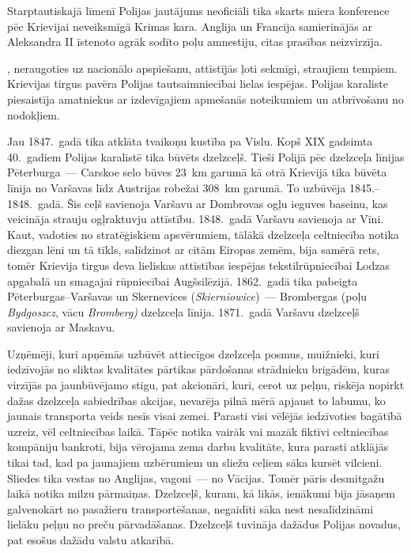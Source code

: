 \documentclass[twoside,a5paper,12pt,fleqn,openany]{extbook}
\newcommand{\pltxti}[1]{\textit{\textpolish{#1}}}
\newcommand{\detxti}[1]{\textit{\textgerman{#1}}}
\begin{document}
Starptautiskajā līmenī Polijas jautājums neoficiāli tika skarts miera konference pēc Krievijai neveiksmīgā Krimas kara. Anglija un Francija samierinājās ar Aleksandra II īstenoto agrāk sodīto poļu amnestiju, citas prasības neizvirzīja.

, neraugoties uz nacionālo apspiešanu, attīstījās ļoti sekmīgi, straujiem tempiem. Krievijas tirgus pavēra Polijas tautsaimniecībai lielas iespējas. Polijas karaliste piesaistīja amatniekus ar izdevīgajiem apmešanās noteikumiem un atbrīvošanu no nodokļiem.

Jau 1847.~gadā tika atklāta tvaikoņu kustība pa Vislu. Kopš XIX gadsimta 40.~gadiem Polijas karalistē tika būvēts dzelzceļš. Tieši Polijā pēc dzelzceļa līnijas Pēterburga~--- Carskoe selo būves 23~km garumā kā otrā Krievijā tika būvēta līnija no Varšavas līdz Austrijas robežai 308~km garumā. To uzbūvēja 1845.--1848.~gadā. Šis ceļš savienoja Varšavu ar Dombrovas ogļu ieguves baseinu, kas veicināja strauju ogļraktuvju attīstību. 1848.~gadā Varšavu savienoja ar Vīni. Kaut, vadoties no stratēģiskiem apsvērumiem, tālākā dzelzceļa celtniecība notika diezgan lēni un tā tīkls, salīdzinot ar citām Eiropas zemēm, bija samērā rets, tomēr Krievija tirgus deva lieliskas attīstības iespējas tekstilrūpniecībai Lodzas apgabalā un smagajai rūpniecībai Augšsilēzijā. 1862.~gadā tika pabeigta Pēterburgas--Varšavas un Skernevices (\pltxti{Skierniowice})~--- Brombergas (poļu \pltxti{Bydgoszcz}, vācu \detxti{Bromberg)} dzelzceļa līnija. 1871.~gadā Varšavu dzelzceļš savienoja ar Maskavu.

Uzņēmēji, kuri apņēmās uzbūvēt attiecīgos dzelzceļa posmus, muižnieki, kuri iedzīvojās no sliktas kvalitātes pārtikas pārdošanas strādnieku brigādēm, kuras virzījās pa jaunbūvējamo stigu, pat akcionāri, kuri, cerot uz peļņu, riskēja nopirkt dažas dzelzceļa sabiedrības akcijas, nevarēja pilnā mērā apjaust to labumu, ko jaunais transporta veids nesīs visai zemei. Parasti visi vēlējās iedzīvoties bagātībā uzreiz, vēl celtniecības laikā. Tāpēc notika vairāk vai mazāk fiktīvi celtniecības kompāniju bankroti, bija vērojama zema darbu kvalitāte, kura parasti atklājās tikai tad, kad pa jaunajiem uzbērumiem un sliežu ceļiem sāka kursēt vilcieni. Sliedes tika vestas no Anglijas, vagoni~--- no Vācijas. Tomēr pāris desmitgažu laikā notika milzu pārmaiņas. Dzelzceļš, kuram, kā likās, ienākumi bija jāsaņem galvenokārt no pasažieru transportēšanas, negaidīti sāka nest nesalīdzināmi lielāku peļņu no preču pārvadāšanas. Dzelzceļš tuvināja dažādus Polijas novadus, pat esošus dažādu valstu atkarībā.
\end{document}
